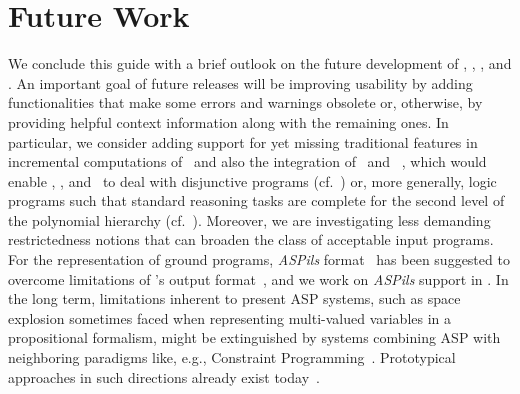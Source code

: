 \section{Future Work}\label{sec:future}

We conclude this guide with a brief outlook on the future development
of \gringo, \clasp, \clingo, and \iclingo.
An important goal of future releases will be improving usability
by adding functionalities that make some errors and warnings obsolete or,
otherwise, by providing helpful context information along with the remaining ones.
In particular, we consider adding support for yet missing traditional
features in incremental computations of \iclingo\
and also the integration of \clasp\ and \claspD~\cite{drgegrkakoossc08a},
which would enable \clasp, \clingo, and \iclingo\ to deal with disjunctive programs
(cf.~\cite{eitgot95a}) or, more generally, logic programs such that standard reasoning tasks
are complete for the second level of the polynomial hierarchy (cf.~\cite{papadimitriou94a}).
Moreover, we are investigating less demanding restrictedness notions
that can broaden the class of
acceptable input programs.
For the representation of ground programs,
\emph{ASPils} format~\cite{gejaosscth08a} has been suggested to overcome
limitations of \lparse's output format~\cite{lparseManual},
and we work on \emph{ASPils} support in \clasp.
In the long term,
limitations inherent to present ASP systems,
such as space explosion sometimes faced when representing
multi-valued variables in a propositional formalism,
might be extinguished by systems combining ASP with
neighboring paradigms like, e.g., Constraint Programming~\cite{robewa06a}.
Prototypical approaches in such directions already exist
today~\cite{melgel08a,niolti06a}.


